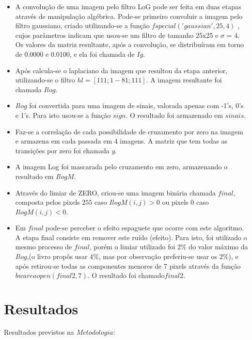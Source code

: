 \documentclass[conference]{IEEEtran}
\begin{document}
\begin{itemize}
	\item A convolu\c{c}\~ao de uma imagem pelo filtro LoG pode ser feita em duas etapas atrav\'es de manipula\c{c}\~ao alg\'ebrica. Pode-se primeiro convoluir a imagem pelo filtro gaussiano, criado utilizando-se a fun\c{c}\~ao $ fspecial( 'gaussian',25,4)$ , cujos par\^ametros indicam que usou-se um filtro de tamanho 25x25 e $\sigma$ = 4. Os valores da matriz resultante, ap\'os a convolu\c{c}\~ao,  se distribu\'iram em torno de 0.0000 e 0.0100, e ela foi chamada de $Ig$.
	\item Ap\'os calcula-se o laplaciano da imagem que resultou da etapa anterior, utilizando-se o filtro $hl = [1 1 1;1 -8 1; 1 1 1]$. A imagem resultante foi chamada $Ilog$.
	\item $Ilog$ foi convertida para uma imagem de sinais, valorada apenas com -1's, 0's e 1's. Para isto usou-se a fun\c{c}\~ao $sign$. O resultado foi armazenado em $sinais$.
	\item Faz-se a correla\c{c}\~ao de cada possibilidade de cruzamento por zero na imagem e armazena em cada passada em 4 imagens. A matriz que tem todas as transi\c{c}\~oes por zero foi chamada $y$.
	\item A imagem Log foi mascarada pelo cruzamento em zero, armazenando o resultado em $IlogM$.
	\item Atrav\'es do limiar de ZERO, criou-se uma imagem bin\'aria chamada $final$, composta pelos pixels $255$ caso $IlogM(i,j)>0$ ou pixels $0$ caso $IlogM(i,j)<0$.
	\item Em $final $ pode-se perceber o efeito espaguete que ocorre com este algoritmo. A etapa final consiste em remover este ru\'ido (efeito). Para isto, foi utilizado o mesmo processo de $final$, por\'em o limiar utilizado foi $2\%$ do valor m\'aximo da $Ilog$,(o livro prop\^os usar $4\%$, mas por observa\c{c}\~ao preferiu-se usar os  $2\%$), e ap\'os retirou-se todas as componentes menores de 7 pixels atrav\'es da fun\c{c}\~ao $bwareaopen(final2, 7)$. O resultado foi chamado$final2$.



\end{itemize}

\section{Resultados} 
\label{sec:meth} 
Resultados previstos na $Metodologia$:
\end{document}
